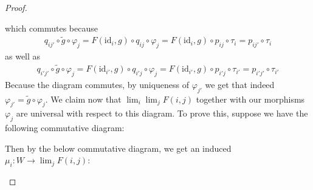 \documentclass{article}
\newcommand{\id}{\mathrm{id}}
\begin{document}
\begin{proof}
\begin{center}
    \end{center}
    which commutes because
    \begin{align*}
        q_{ij'}\circ \tilde g\circ \varphi_j=F(\id_{i},g)\circ q_{ij}\circ \varphi_j=F(\id_i,g)\circ p_{ij}\circ \tau_i=p_{ij'}\circ \tau_i
    \end{align*}
    as well as
    \begin{align*}
        q_{i'j'}\circ \tilde g\circ \varphi_j=F(\id_{i'},g)\circ q_{i'j}\circ \varphi_j=F(\id_{i'},g)\circ p_{i'j}\circ \tau_{i'}=p_{i'j'}\circ \tau_{i'}
    \end{align*}
    Because the diagram commutes, by uniqueness of $\varphi_{j'}$ we get that indeed $\varphi_{j'}=\tilde g\circ \varphi_j$. We claim now that $\lim_i \lim_j F(i,j)$ together with our morphisms $\varphi_j$ are universal with respect to this diagram. To prove this, suppose we have the following commutative diagram:
    \begin{center}
    \end{center}
    Then by the below commutative diagram, we get an induced $\mu_i:W\to \lim_j F(i,j)$:
    \begin{center}
\end{center}
\end{proof}
\end{document}
